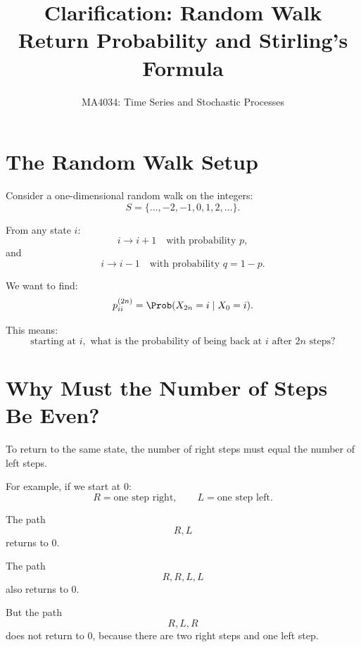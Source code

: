 \documentclass[12pt,a4paper]{article}
\title{\textbf{Clarification: Random Walk Return Probability and Stirling's Formula}}
\author{MA4034: Time Series and Stochastic Processes}
\date{}
\theoremstyle{notestyle}
\begin{document}
\maketitle

\section{The Random Walk Setup}

Consider a one-dimensional random walk on the integers:
\[
S=\{\ldots,-2,-1,0,1,2,\ldots\}.
\]

From any state $i$:
\[
i\to i+1
\quad\text{with probability }p,
\]
and
\[
i\to i-1
\quad\text{with probability }q=1-p.
\]

\begin{center}
\end{center}

We want to find:
\[
p_{ii}^{(2n)}
=
\Prob(X_{2n}=i\mid X_0=i).
\]

This means:
\[
\text{starting at }i,\text{ what is the probability of being back at }i\text{ after }2n\text{ steps?}
\]

\section{Why Must the Number of Steps Be Even?}

To return to the same state, the number of right steps must equal the number of left steps.

For example, if we start at $0$:
\[
R = \text{one step right},\qquad L=\text{one step left}.
\]

The path
\[
R,L
\]
returns to 0.

The path
\[
R,R,L,L
\]
also returns to 0.

But the path
\[
R,L,R
\]
does not return to 0, because there are two right steps and one left step.
\end{document}
